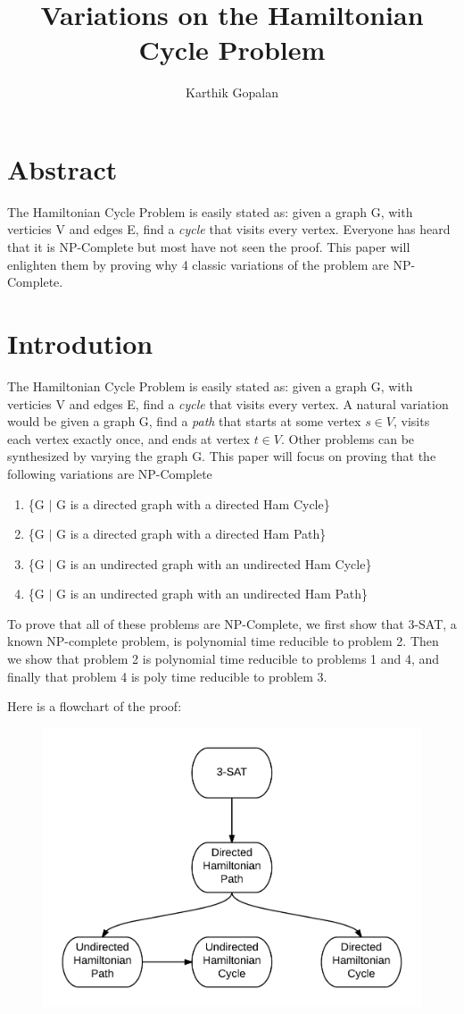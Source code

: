 \documentclass[11pt]{article}
\begin{document}
\title{Variations on the Hamiltonian Cycle Problem}
\author{Karthik Gopalan}
\maketitle

\vfill
\section{Abstract}
The Hamiltonian Cycle Problem is easily stated as: given a graph G,
with verticies V and edges E, find a \emph{cycle} that visits every vertex.
Everyone has heard that it is NP-Complete but most have not seen the proof.
This paper will enlighten them by proving why 4 classic variations of
the problem are NP-Complete.

\section{Introdution}
The Hamiltonian Cycle Problem is easily stated as: given a graph G, 
with verticies V and edges E, find a \emph{cycle} that visits every vertex. 
A natural variation would be given a graph G, find a \emph{path} that starts at some 
vertex $s \in V$, visits each vertex exactly once, and ends at vertex $t \in V$. Other problems can be synthesized
by varying the graph G. This paper will focus on proving that the following variations are NP-Complete

\begin{enumerate}
\item \{G $|$ G is a directed graph with a directed Ham Cycle\}
\item \{G $|$ G is a directed graph with a directed Ham Path\}
\item \{G $|$ G is an undirected graph with an undirected Ham Cycle\}
\item \{G $|$ G is an undirected graph with an undirected Ham Path\}
\end{enumerate}

To prove that all of these problems are NP-Complete, we first show that 3-SAT, a known
NP-complete problem, is polynomial time reducible to problem 2. Then we show that problem
2 is polynomial time reducible to problems 1 and 4, and finally that problem 4 is poly
time reducible to problem 3.

\newpage
Here is a flowchart of the proof:
\begin{figure}[h]
\centering
\includegraphics[width=.5\textwidth]{ProofOutline.png}
\end{figure}
\end{document}
